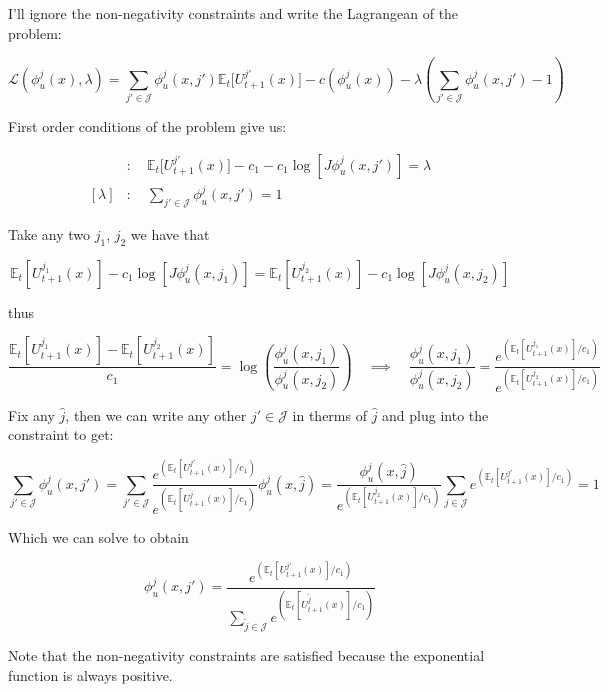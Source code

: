 \documentclass[
  letterpaper,
  DIV=11,
  numbers=noendperiod]{scrreprt}
\begin{document}
I'll ignore the non-negativity constraints and write the Lagrangean of
the problem:

\[\mathcal{L}(\phi^j_u(x), \lambda) =  \sum_{j'\in\mathcal{J}} \phi^j_u(x, j')\mathbb{E}_t\Big[U^{j'}_{t+1}(x)  \Big] -c(\phi^j_u(x)) - \lambda \left(\sum_{j'\in \mathcal{J}}\phi^j_u(x, j') - 1\right)\]

First order conditions of the problem give us:

\begin{align*}
  [\phi^j_u(x, j')] &:\quad \mathbb{E}_t\Big[U^{j'}_{t+1}(x)  \Big] - c_1 - c_1 \log[J \phi^j_u(x, j')] = \lambda \\
  [\lambda] &: \quad \sum_{j'\in \mathcal{J}}\phi^j_u(x, j') = 1
\end{align*}

Take any two \(j_1\), \(j_2\) we have that

\[\mathbb{E}_t\left[U^{j_1}_{t+1}(x)  \right] - c_1 \log[J \phi^j_u(x, j_1)] = \mathbb{E}_t\left[U^{j_2}_{t+1}(x)  \right] - c_1 \log[J \phi^j_u(x, j_2)]\]

thus

\[\frac{\mathbb{E}_t\left[U^{j_1}_{t+1}(x)\right] - \mathbb{E}_t\left[U^{j_2}_{t+1}(x)\right]}{c_1} = \log\left(\frac{ \phi^j_u(x, j_1)}{ \phi^j_u(x, j_2)}\right) \quad \implies \quad \frac{ \phi^j_u(x, j_1)}{ \phi^j_u(x, j_2)} = \frac{e^{\left(\mathbb{E}_t\left[U^{j_1}_{t+1}(x)\right] /c_1\right)}}{e^{\left(\mathbb{E}_t\left[U^{j_2}_{t+1}(x)\right] /c_1\right)}}\]

Fix any \(\hat{j}\), then we can write any other \(j'\in\mathcal{J}\) in
therms of \(\hat{j}\) and plug into the constraint to get:

\[\sum_{j'\in \mathcal{J}}\phi^j_u(x, j') =\sum_{j'\in \mathcal{J}}\frac{e^{\left(\mathbb{E}_t\left[U^{j'}_{t+1}(x)\right] /c_1\right)}}{e^{\left(\mathbb{E}_t\left[U^{\hat{j}}_{t+1}(x)\right] /c_1\right)}} \phi^j_u(x, \hat{j}) = \frac{\phi^j_u(x, \hat{j})}{e^{\left(\mathbb{E}_t\left[U^{j_2}_{t+1}(x)\right] /c_1\right)}} \sum_{j\in \mathcal{J}}e^{\left(\mathbb{E}_t\left[U^{j'}_{t+1}(x)\right] /c_1\right)} = 1\]

Which we can solve to obtain

\[\boxed{
  \phi^j_u(x,j') = \frac{e^{\left(\mathbb{E}_t\left[U^{j'}_{t+1}(x)\right] /c_1\right)}}{\sum_{\tilde{j}\in \mathcal{J}}e^{\left(\mathbb{E}_t\left[U^{\tilde{j}}_{t+1}(x)\right] /c_1\right)}}}\]

Note that the non-negativity constraints are satisfied because the
exponential function is always positive.
\end{document}
